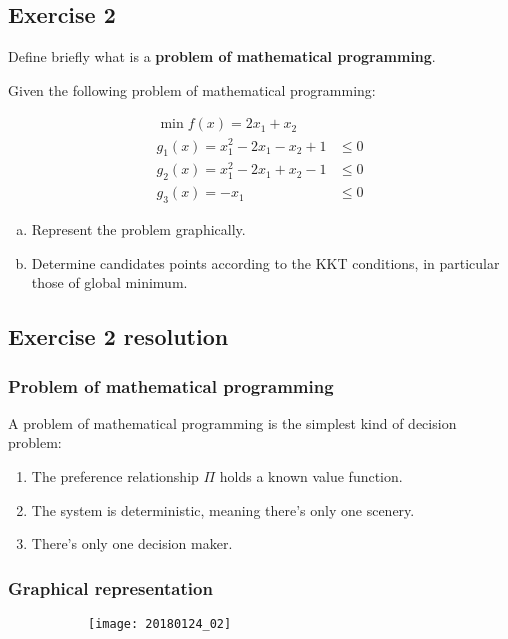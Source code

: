\documentclass[\main/main.tex]{subfiles}
\begin{document}
\subsection{Exercise 2}
Define briefly what is a \textbf{problem of mathematical programming}.

Given the following problem of mathematical programming:

\begin{align*}
  \min f(x) = 2x_1 + x_2                   \\
  g_1(x) = x_1^2 - 2x_1 - x_2 + 1 & \leq 0 \\
  g_2(x) = x_1^2 - 2x_1 + x_2 -1  & \leq 0 \\
  g_3(x) = -x_1                   & \leq 0
\end{align*}
\begin{enumerate}[a)]
  \item Represent the problem graphically.
  \item Determine candidates points according to the KKT conditions, in particular those of global minimum.
\end{enumerate}

\subsection{Exercise 2 resolution}
\subsubsection*{Problem of mathematical programming}
A problem of mathematical programming is the simplest kind of decision problem:

\begin{enumerate}
  \item The preference relationship $\Pi$ holds a known value function.
  \item The system is deterministic, meaning there's only one scenery.
  \item There's only one decision maker.
\end{enumerate}

\subsubsection*{Graphical representation}
\begin{figure}
  \begin{subfigure}{0.49\textwidth}
  \end{subfigure}
  \begin{subfigure}{0.49\textwidth}
    \texttt{[image: 20180124\_02]}
  \end{subfigure}
\end{figure}
\end{document}
